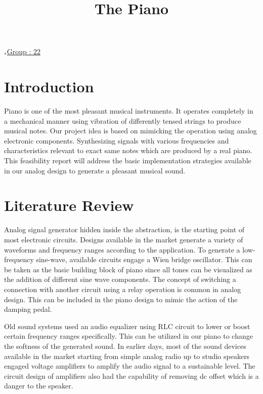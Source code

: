 \documentclass[10pt]{article}
\title{\bf{The Piano}}
\author{}
\author{\vspace{-2ex}}
\date{}
\date{\vspace{-2ex}}
\begin{document}
\begin{flushright}
    $_*$\underline{Group : 22}
\end{flushright}
\vspace{-10ex}
{\let\newpage\relax\maketitle}
\vspace{-12ex}
\section*{Introduction}
\vspace{-1.5ex}
Piano is one of the most pleasant musical instruments. It operates completely in a mechanical manner using vibration of differently tensed strings to produce musical notes. Our project idea is based on mimicking the operation using analog electronic components. Synthesizing signals with various frequencies and characteristics relevant to exact same notes which are produced by a real piano. This feasibility report will address the basic implementation strategies available in our analog design to generate a pleasant musical sound.
\vspace{-1ex}
\section*{Literature Review}
\vspace{-1.5ex}
Analog signal generator hidden inside the abstraction, is the starting point of most electronic circuits. Designs available in the market generate a variety of waveforms and frequency ranges according to the application. To generate a low-frequency sine-wave, available circuits engage a Wien bridge oscillator. This can be taken as the basic building block of piano since all tones can be visualized as the addition of different sine wave components. The concept of switching a connection with another circuit using a relay operation is common in analog design. This can be included in the piano design to mimic the action of the damping pedal.
\par
Old sound systems used an audio equalizer using RLC circuit to lower or boost certain frequency ranges specifically. This can be utilized in our piano to change the softness of the generated sound. In earlier days, most of the sound devices available in the market starting from simple analog radio up to studio speakers engaged voltage amplifiers to amplify the audio signal to a sustainable level. The circuit design of amplifiers also had the capability of removing dc offset which is a danger to the speaker.
\vspace{-1ex}
\end{document}
